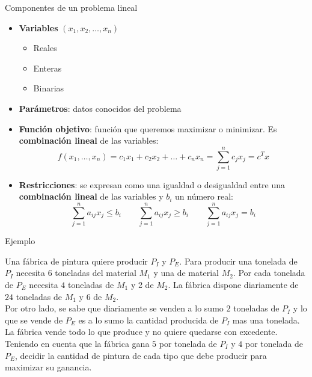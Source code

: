 \documentclass[10pt, aspectratio=169]{beamer}
\begin{document}
\begin{frame}[fragile]{Componentes de un problema lineal}
    \begin{itemize}
        \item \textbf{Variables} $(x_1, x_2, \dots, x_n)$
            \begin{itemize}
                \item Reales
                \item Enteras
                \item Binarias
            \end{itemize}
        \item \textbf{Parámetros}: datos conocidos del problema
        \item \textbf{Función objetivo}: función que queremos maximizar o minimizar. Es \textbf{combinación lineal} de las variables:
        \small
        \[ f(x_1, \dots, x_n)= c_1x_1+c_2x_2+\dots+c_nx_n = \sum_{j=1}^n c_jx_j=c^Tx  \]
        \normalsize
        \item \textbf{Restricciones}: se expresan como una igualdad o desigualdad entre una \textbf{combinación lineal} de las variables y $b_i$ un número real:
        \small{
        \[ \sum_{j=1}^n a_{ij}x_j \leq b_i \qquad \sum_{j=1}^n a_{ij}x_j \geq b_i \qquad \sum_{j=1}^n a_{ij}x_j = b_i\]        
        }
    \end{itemize}
\end{frame}


\begin{frame}{Ejemplo}
\parbox{\linewidth}{
Una fábrica de pintura quiere producir $P_I$ y $P_E$. Para producir una tonelada de $P_I$ necesita 6 toneladas del material $M_1$ y una de material $M_2$. Por cada tonelada de $P_E$ necesita $4$ toneladas de $M_1$ y 2 de $M_2$. La fábrica dispone diariamente de $24$ toneladas de $M_1$ y $6$ de $M_2$.\\

Por otro lado, se sabe que diariamente se venden a lo sumo $2$ toneladas de $P_I$ y lo que se vende de $P_E$ es a lo sumo la cantidad producida de $P_I$ mas una tonelada.
La fábrica vende todo lo que produce y no quiere quedarse con excedente. \\

Teniendo en cuenta que la fábrica gana $5$ por tonelada de $P_I$ y $4$ por tonelada de $P_E$, decidir la cantidad de pintura de cada tipo que debe producir para maximizar su ganancia. }
\end{frame}
\end{document}
